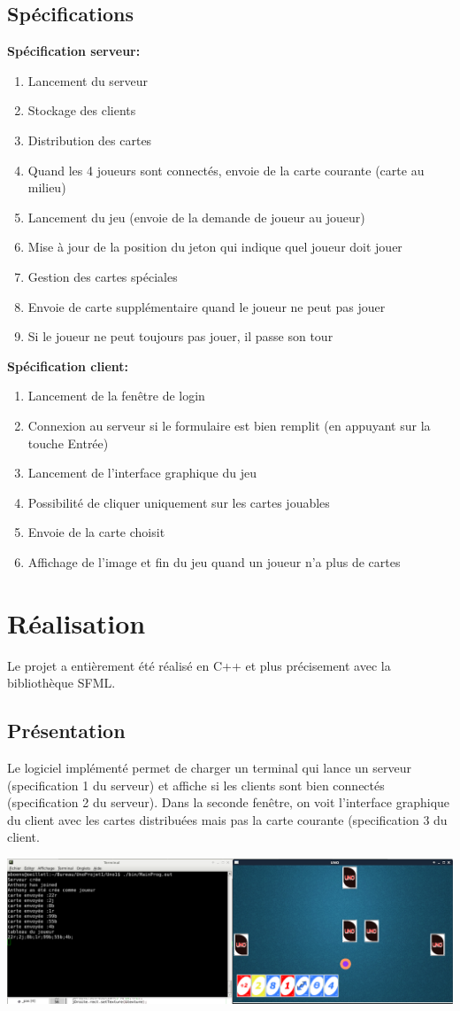 \documentclass[french]{article}
\begin{document}
\subsection{Spécifications}
\textbf{Spécification serveur:}
\begin{enumerate}
	\item Lancement du serveur
	\item Stockage des clients
	\item Distribution des cartes
	\item Quand les 4 joueurs sont connectés, envoie de la carte courante (carte au milieu)
	\item Lancement du jeu (envoie de la demande de joueur au joueur)
	\item Mise à jour de la position du jeton qui indique quel joueur doit jouer
	\item Gestion des cartes spéciales
	\item Envoie de carte supplémentaire quand le joueur ne peut pas jouer
	\item Si le joueur ne peut toujours pas jouer, il passe son tour
\end{enumerate}

\textbf{Spécification client:}
\begin{enumerate}
	\item Lancement de la fenêtre de login
	\item Connexion au serveur si le formulaire est bien remplit (en appuyant sur la touche Entrée)
	\item Lancement de l'interface graphique du jeu
	\item Possibilité de cliquer uniquement sur les cartes \og jouables\fg{}
	\item Envoie de la carte choisit
	\item Affichage de l'image et fin du jeu quand un joueur n'a plus de cartes
\end{enumerate}

\section{Réalisation}
Le projet a entièrement été réalisé en C++ et plus précisement avec la bibliothèque SFML.

\subsection{Présentation} 
Le logiciel implémenté permet de charger un terminal qui lance un serveur (specification 1 du serveur) et affiche si les clients sont bien connectés (specification 2 du serveur). Dans la seconde fenêtre, on voit l'interface graphique du client avec les cartes distribuées mais pas la carte courante (specification 3 du client.
\begin{center}
\centering
\includegraphics[width=0.7\linewidth]{cp}
\end{center}
\end{document}
